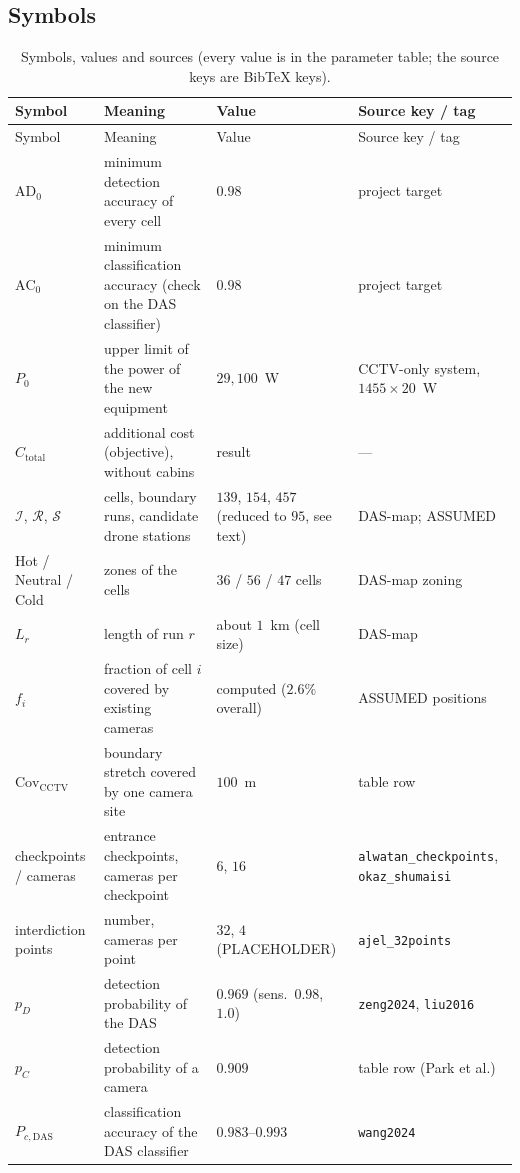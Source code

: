 \documentclass[11pt,a4paper]{article}
\newcommand{\ADzero}{\mathrm{AD}_{0}}
\newcommand{\ACzero}{\mathrm{AC}_{0}}
\newcommand{\Ctotal}{C_{\mathrm{total}}}
\newcommand{\Pzero}{P_{0}}
\newcommand{\src}[1]{\texttt{#1}}
\begin{document}
\subsection{Symbols}
\begin{longtable}{@{}p{2.9cm}p{5.6cm}p{3.2cm}p{3.6cm}@{}}
\caption{Symbols, values and sources (every value is in the parameter table; the source keys are BibTeX keys).}\label{tab:symbols}\\
\toprule
Symbol & Meaning & Value & Source key / tag \\ \midrule
\endfirsthead
\toprule Symbol & Meaning & Value & Source key / tag \\ \midrule
\endhead
\bottomrule
\endfoot
$\ADzero$ & minimum detection accuracy of every cell & $0.98$ & project target \\
$\ACzero$ & minimum classification accuracy (check on the DAS classifier) & $0.98$ & project target \\
$\Pzero$ & upper limit of the power of the new equipment & $29{,}100$~W & CCTV-only system, $1455\times20$~W \\
$\Ctotal$ & additional cost (objective), without cabins & result & --- \\
$\mathcal{I}$, $\mathcal{R}$, $\mathcal{S}$ & cells, boundary runs, candidate drone stations & $139$, $154$, $457$ (reduced to $95$, see text) & DAS-map; ASSUMED \\
Hot / Neutral / Cold & zones of the cells & $36$ / $56$ / $47$ cells & DAS-map zoning \\
$L_r$ & length of run $r$ & about $1$~km (cell size) & DAS-map \\
$f_i$ & fraction of cell $i$ covered by existing cameras & computed ($2.6\%$ overall) & ASSUMED positions \\
$\mathrm{Cov}_{\mathrm{CCTV}}$ & boundary stretch covered by one camera site & $100$~m & table row \\
checkpoints / cameras & entrance checkpoints, cameras per checkpoint & $6$, $16$ & \src{alwatan\_checkpoints}, \src{okaz\_shumaisi} \\
interdiction points & number, cameras per point & $32$, $4$ (PLACEHOLDER) & \src{ajel\_32points} \\
$p_D$ & detection probability of the DAS & $0.969$ (sens.\ $0.98$, $1.0$) & \src{zeng2024}, \src{liu2016} \\
$p_C$ & detection probability of a camera & $0.909$ & table row (Park et al.) \\
$P_{c,\mathrm{DAS}}$ & classification accuracy of the DAS classifier & $0.983$--$0.993$ & \src{wang2024} \\

\end{longtable}
\end{document}
